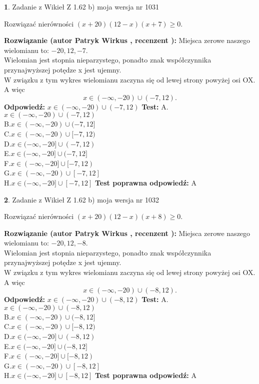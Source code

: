 \documentclass[12pt, a4paper]{article}
\theoremstyle{definition} %
\newtheorem{zad}{}
\newcommand{\zadStart}[1]{\begin{zad}#1\newline}
\newcommand{\zadStop}{\end{zad}}
\newcommand{\rozwStart}[2]{\noindent \textbf{Rozwiązanie (autor #1 , recenzent #2): }\newline}
\newcommand{\rozwStop}{\newline}
\newcommand{\odpStart}{\noindent \textbf{Odpowiedź:}\newline}
\newcommand{\odpStop}{\newline}
\newcommand{\testStart}{\noindent \textbf{Test:}\newline}
\newcommand{\testStop}{\newline}
\newcommand{\kluczStart}{\noindent \textbf{Test poprawna odpowiedź:}\newline}
\newcommand{\kluczStop}{\newline}
\begin{document}
\zadStart{Zadanie z Wikieł Z 1.62 b) moja wersja nr 1031}

Rozwiązać nierówności $(x+20)(12-x)(x+7)\ge0$.
\zadStop
\rozwStart{Patryk Wirkus}{}
Miejsca zerowe naszego wielomianu to: $-20, 12, -7$.\\
Wielomian jest stopnia nieparzystego, ponadto znak współczynnika przy\linebreak najwyższej potędze x jest ujemny.\\ W związku z tym wykres wielomianu zaczyna się od lewej strony powyżej osi OX. A więc $$x \in (-\infty,-20) \cup (-7,12).$$
\rozwStop
\odpStart
$x \in (-\infty,-20) \cup (-7,12)$
\odpStop
\testStart
A.$x \in (-\infty,-20) \cup (-7,12)$\\
B.$x \in (-\infty,-20) \cup (-7,12]$\\
C.$x \in (-\infty,-20) \cup [-7,12)$\\
D.$x \in (-\infty,-20] \cup (-7,12)$\\
E.$x \in (-\infty,-20] \cup (-7,12]$\\
F.$x \in (-\infty,-20] \cup [-7,12)$\\
G.$x \in (-\infty,-20) \cup [-7,12]$\\
H.$x \in (-\infty,-20] \cup [-7,12]$
\testStop
\kluczStart
A
\kluczStop



\zadStart{Zadanie z Wikieł Z 1.62 b) moja wersja nr 1032}

Rozwiązać nierówności $(x+20)(12-x)(x+8)\ge0$.
\zadStop
\rozwStart{Patryk Wirkus}{}
Miejsca zerowe naszego wielomianu to: $-20, 12, -8$.\\
Wielomian jest stopnia nieparzystego, ponadto znak współczynnika przy\linebreak najwyższej potędze x jest ujemny.\\ W związku z tym wykres wielomianu zaczyna się od lewej strony powyżej osi OX. A więc $$x \in (-\infty,-20) \cup (-8,12).$$
\rozwStop
\odpStart
$x \in (-\infty,-20) \cup (-8,12)$
\odpStop
\testStart
A.$x \in (-\infty,-20) \cup (-8,12)$\\
B.$x \in (-\infty,-20) \cup (-8,12]$\\
C.$x \in (-\infty,-20) \cup [-8,12)$\\
D.$x \in (-\infty,-20] \cup (-8,12)$\\
E.$x \in (-\infty,-20] \cup (-8,12]$\\
F.$x \in (-\infty,-20] \cup [-8,12)$\\
G.$x \in (-\infty,-20) \cup [-8,12]$\\
H.$x \in (-\infty,-20] \cup [-8,12]$
\testStop
\kluczStart
A
\kluczStop
\end{document}
